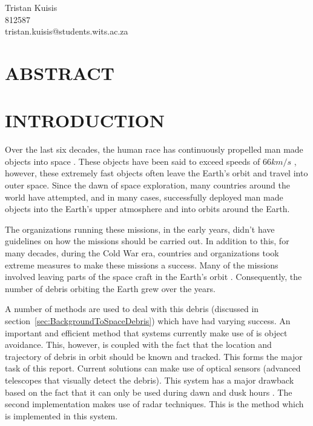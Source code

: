 \documentclass[11pt]{witseiepaper}
\begin{document}
\begin{bibunit}[witseie]
\begin{center}
\vspace{2cm}
{\Large Tristan Kuisis} \\
{\small 812587} \\
{\small tristan.kuisis@students.wits.ac.za}
\end{center}

\section*{ABSTRACT}


\clearpage


\clearpage

\tableofcontents

\listoffigures

\listoftables

\onecolumn
\clearpage
{}


\section{INTRODUCTION} \label{sec:INTRODUCTION}

Over the last six decades, the human race has continuously propelled man made objects into space \cite{sputnik}. These objects have been said to exceed speeds of $66 km/s$ \cite{fastestObject}, however, these extremely fast objects often leave the Earth's orbit and travel into outer space. Since the dawn of space exploration, many countries around the world have attempted, and in many cases, successfully deployed man made objects into the Earth's upper atmosphere and into orbits around the Earth.

The organizations running these missions, in the early years, didn't have guidelines on how the missions should be carried out. In addition to this, for many decades, during the Cold War era, countries and organizations took extreme measures to make these missions a success. Many of the missions involved leaving parts of the space craft in the Earth's orbit \cite{spaceDebrisGuide}. Consequently, the number of debris orbiting the Earth grew over the years.

A number of methods are used to deal with this debris (discussed in section~\ref{sec:BackgroundToSpaceDebris}) which have had varying success.
An important and efficient method that systems currently make use of is object avoidance. This, however, is coupled with the fact that the location and trajectory of debris in orbit should be known and tracked. This forms the major task of this report.
Current solutions can make use of optical sensors (advanced telescopes that visually detect the debris). This system has a major drawback based on the fact that it can only be used during dawn and dusk hours \cite{OrbitalDebrisTechnicalAssessment,telescope,ZenithRanging}.
The second implementation makes use of radar techniques. This is the method which is implemented in this system.


\end{bibunit}
\end{document}
